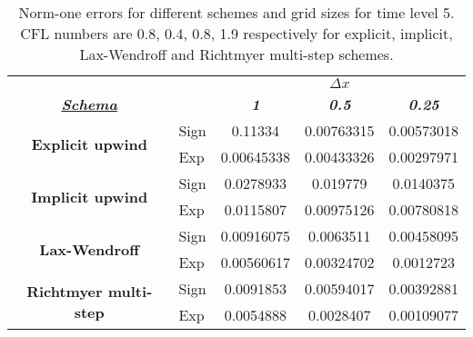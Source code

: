 	\begin{table}[]
		\centering
		\caption[Norm-one errors for different schemes and grid sizes for time level 5.]
		{Norm-one errors for different schemes and grid sizes for time level 5. CFL numbers are 0.8, 0.4, 0.8, 1.9 respectively for explicit, implicit, Lax-Wendroff and Richtmyer multi-step schemes.}
		\label{tab:gridConvergence}
			\begin{tabular}{cl|c|c|c|}
				\cline{3-5}
				\textit{\textbf{}} &  & \multicolumn{3}{c|}{{\ul \textit{\textbf{$\Delta x$}}}} \\ \cline{1-1} \cline{3-5} 
				\multicolumn{1}{|c|}{{\ul \textit{\textbf{Schema}}}} &  & \textit{\textbf{1}} & \textit{\textbf{0.5}} & \textit{\textbf{0.25}} \\ \hline \hline
				\multicolumn{1}{|c|}{\multirow{2}{*}{\textbf{Explicit upwind}}} & Sign & 0.11334 & 0.00763315 & 0.00573018 \\ \cline{2-5} 
				\multicolumn{1}{|l|}{} & Exp & 0.00645338 & 0.00433326 & 0.00297971 \\ \hline \hline
				\multicolumn{1}{|c|}{\multirow{2}{*}{\textbf{Implicit upwind}}} & Sign & 0.0278933 & 0.019779 & 0.0140375 \\ \cline{2-5} 
				\multicolumn{1}{|c|}{} & Exp & 0.0115807 & 0.00975126 & 0.00780818 \\ \hline \hline
				\multicolumn{1}{|c|}{\multirow{2}{*}{\textbf{Lax-Wendroff}}} & Sign & 0.00916075 & 0.0063511 & 0.00458095 \\ \cline{2-5} 
				\multicolumn{1}{|c|}{} & Exp & 0.00560617 & 0.00324702 & 0.0012723 \\ \hline \hline 
				\multicolumn{1}{|c|}{\multirow{2}{*}{\textbf{Richtmyer multi-step}}} & Sign & 0.0091853 & 0.00594017 & 0.00392881 \\ \cline{2-5} 
				\multicolumn{1}{|c|}{} & Exp & 0.0054888 & 0.0028407 & 0.00109077 \\ \hline
			\end{tabular}
		\end{table}